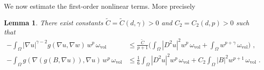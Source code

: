 \documentclass[10pt, a4paper, reqno, oneside]{amsart}
\theoremstyle{plain}
\theoremstyle{definition}
\theoremstyle{plain}
\newtheorem{lemma}[theo]{Lemma}
\theoremstyle{definition}
\theoremstyle{plain}
\renewcommand{\=}{:=}
\begin{document}
We now estimate the first-order nonlinear terms. More precisely

\begin{lemma}
There exist constants $\tilde{C}=\tilde{C}(d,\gamma)>0$ and $C_2=C_2(d,p)>0$ such that
\begin{align}
\label{est3}
-\int_\Omega |\nabla u|^{\gamma-2} g(\nabla u,\nabla w)\,w^p\,\omega_{\mathrm{vol}} &\leq
\frac{\tilde{C}}{p+1} \bigg(\int_\Omega |D^2u|^2w^p\,\omega_{\mathrm{vol}}
+\int_\Omega w^{p+\gamma}\,\omega_{\mathrm{vol}}\bigg) \,\, , \\
\label{est4}
-\int_\Omega g(\nabla (g(B,\nabla u)), \nabla u)\,w^p\,\omega_{\mathrm{vol}} &\leq
\tfrac16 \int_\Omega |D^2u|^2w^p\,\omega_{\mathrm{vol}}
+C_2\int_\Omega |B|^2w^{p+1}\,\omega_{\mathrm{vol}} \,\, .
\end{align}
\end{lemma}
\end{document}
